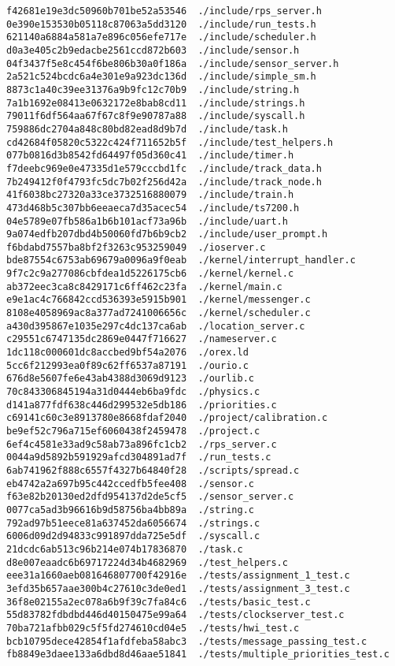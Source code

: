 \documentclass[letterpaper]{article}
\begin{document}
\begin{verbatim}
f42681e19e3dc50960b701be52a53546  ./include/rps_server.h
0e390e153530b05118c87063a5dd3120  ./include/run_tests.h
621140a6884a581a7e896c056efe717e  ./include/scheduler.h
d0a3e405c2b9edacbe2561ccd872b603  ./include/sensor.h
04f3437f5e8c454f6be806b30a0f186a  ./include/sensor_server.h
2a521c524bcdc6a4e301e9a923dc136d  ./include/simple_sm.h
8873c1a40c39ee31376a9b9fc12c70b9  ./include/string.h
7a1b1692e08413e0632172e8bab8cd11  ./include/strings.h
79011f6df564aa67f67c8f9e90787a88  ./include/syscall.h
759886dc2704a848c80bd82ead8d9b7d  ./include/task.h
cd42684f05820c5322c424f711652b5f  ./include/test_helpers.h
077b0816d3b8542fd64497f05d360c41  ./include/timer.h
f7deebc969e0e47335d1e579cccbd1fc  ./include/track_data.h
7b249412f0f4793fc5dc7b02f256d42a  ./include/track_node.h
41f6038bc27320a33ce3732516880079  ./include/train.h
473d468b5c307bb6eeaeca7d35acec54  ./include/ts7200.h
04e5789e07fb586a1b6b101acf73a96b  ./include/uart.h
9a074edfb207dbd4b50060fd7b6b9cb2  ./include/user_prompt.h
f6bdabd7557ba8bf2f3263c953259049  ./ioserver.c
bde87554c6753ab69679a0096a9f0eab  ./kernel/interrupt_handler.c
9f7c2c9a277086cbfdea1d5226175cb6  ./kernel/kernel.c
ab372eec3ca8c8429171c6ff462c23fa  ./kernel/main.c
e9e1ac4c766842ccd536393e5915b901  ./kernel/messenger.c
8108e4058969ac8a377ad7241006656c  ./kernel/scheduler.c
a430d395867e1035e297c4dc137ca6ab  ./location_server.c
c29551c6747135dc2869e0447f716627  ./nameserver.c
1dc118c000601dc8accbed9bf54a2076  ./orex.ld
5cc6f212993ea0f89c62ff6537a87191  ./ourio.c
676d8e5607fe6e43ab4388d3069d9123  ./ourlib.c
70c843306845194a31d0444eb6ba9fdc  ./physics.c
d141a877fdf638c446d299532e5db186  ./priorities.c
c69141c60c3e8913780e8668fdaf2040  ./project/calibration.c
be9ef52c796a715ef6060438f2459478  ./project.c
6ef4c4581e33ad9c58ab73a896fc1cb2  ./rps_server.c
0044a9d5892b591929afcd304891ad7f  ./run_tests.c
6ab741962f888c6557f4327b64840f28  ./scripts/spread.c
eb4742a2a697b95c442ccedfb5fee408  ./sensor.c
f63e82b20130ed2dfd954137d2de5cf5  ./sensor_server.c
0077ca5ad3b96616b9d58756ba4bb89a  ./string.c
792ad97b51eece81a637452da6056674  ./strings.c
6006d09d2d94833c991897dda725e5df  ./syscall.c
21dcdc6ab513c96b214e074b17836870  ./task.c
d8e007eaadc6b69717224d34b4682969  ./test_helpers.c
eee31a1660aeb081646807700f42916e  ./tests/assignment_1_test.c
3efd35b657aae300b4c27610c3de0ed1  ./tests/assignment_3_test.c
36f8e02155a2ec078a6b9f39c7fa84c6  ./tests/basic_test.c
55d83782fdbdbd446d40150475e99a64  ./tests/clockserver_test.c
70ba721afbb029c5f5fd274610cd04e5  ./tests/hwi_test.c
bcb10795dece42854f1afdfeba58abc3  ./tests/message_passing_test.c
fb8849e3daee133a6dbd8d46aae51841  ./tests/multiple_priorities_test.c

\end{verbatim}
\end{document}
